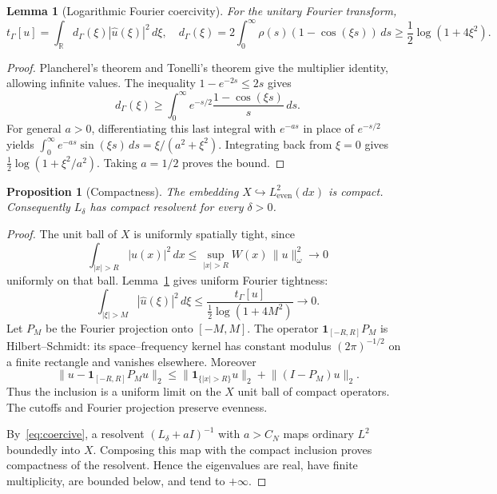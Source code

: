 \documentclass[11pt,a4paper]{article}
\numberwithin{equation}{section}
\newtheorem{proposition}[theorem]{Proposition}
\newtheorem{lemma}[theorem]{Lemma}
\theoremstyle{definition}
\theoremstyle{remark}
\newcommand{\R}{\mathbb R}
\newcommand{\Le}{L^2_{\mathrm{even}}(dx)}
\newcommand{\tg}{t_{\Gamma}}
\newcommand{\norm}[1]{\lVert #1\rVert}
\newcommand{\one}{\mathbf 1}
\begin{document}
\begin{lemma}[Logarithmic Fourier coercivity]\label{lem:fourier}
For the unitary Fourier transform,
\begin{equation}\label{eq:multiplier}
 \tg[u]=\int_\R d_\Gamma(\xi)|\widehat u(\xi)|^2\,d\xi,
 \quad
 d_\Gamma(\xi)=2\int_0^\infty\rho(s)(1-\cos(\xi s))\,ds
 \ge\frac12\log(1+4\xi^2).
\end{equation}
\end{lemma}
\begin{proof}
Plancherel's theorem and Tonelli's theorem give the multiplier identity, allowing infinite values. The inequality $1-e^{-2s}\le2s$ gives
\[
 d_\Gamma(\xi)\ge\int_0^\infty e^{-s/2}\frac{1-\cos(\xi s)}s\,ds.
\]
For general $a>0$, differentiating this last integral with $e^{-as}$ in place of $e^{-s/2}$ yields $\int_0^\infty e^{-as}\sin(\xi s)\,ds=\xi/(a^2+\xi^2)$. Integrating back from $\xi=0$ gives $\tfrac12\log(1+\xi^2/a^2)$. Taking $a=1/2$ proves the bound.
\end{proof}

\begin{proposition}[Compactness]\label{prop:compact}
The embedding $X\hookrightarrow\Le$ is compact. Consequently $L_\delta$ has compact resolvent for every $\delta>0$.
\end{proposition}
\begin{proof}
The unit ball of $X$ is uniformly spatially tight, since
\begin{equation}\label{eq:spatialtight}
 \int_{|x|>R}|u(x)|^2\,dx
 \le\sup_{|x|>R}W(x)\,\norm{u}_\omega^2\longrightarrow0
\end{equation}
uniformly on that ball. Lemma~\ref{lem:fourier} gives uniform Fourier tightness:
\begin{equation}\label{eq:fouriertight}
 \int_{|\xi|>M}|\widehat u(\xi)|^2\,d\xi
 \le\frac{\tg[u]}{\tfrac12\log(1+4M^2)}\longrightarrow0.
\end{equation}
Let $P_M$ be the Fourier projection onto $[-M,M]$. The operator
$\one_{[-R,R]}P_M$ is Hilbert--Schmidt: its space--frequency kernel has constant modulus $(2\pi)^{-1/2}$ on a finite rectangle and vanishes elsewhere. Moreover
\[
 \norm{u-\one_{[-R,R]}P_Mu}_2
 \le\norm{\one_{\{|x|>R\}}u}_2+\norm{(I-P_M)u}_2.
\]
Thus the inclusion is a uniform limit on the $X$ unit ball of compact operators. The cutoffs and Fourier projection preserve evenness.

By~\eqref{eq:coercive}, a resolvent $(L_\delta+aI)^{-1}$ with $a>C_N$ maps ordinary $L^2$ boundedly into $X$. Composing this map with the compact inclusion proves compactness of the resolvent. Hence the eigenvalues are real, have finite multiplicity, are bounded below, and tend to $+\infty$.
\end{proof}
\end{document}
